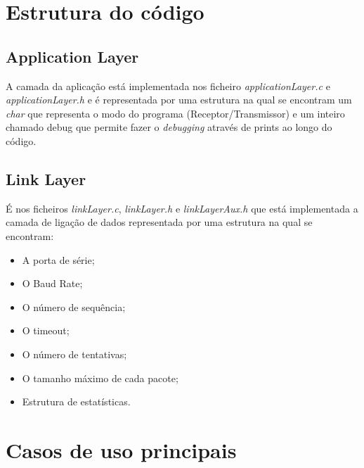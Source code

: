 \documentclass[11pt]{article}
\begin{document}
\section{Estrutura do código}

\subsection{Application Layer}
 
  A camada da aplicação está implementada nos ficheiro \textit{applicationLayer.c} e \textit{applicationLayer.h} e é representada por uma estrutura na qual se encontram um \textit{char} que representa o modo do programa (Receptor/Transmissor) e um inteiro chamado debug que permite fazer o \textit{debugging} através de prints ao longo do código.
 
\small

\normalsize

\subsection{Link Layer}
 
 É nos ficheiros \textit{linkLayer.c}, \textit{linkLayer.h} e \textit{linkLayerAux.h} que está implementada a camada de ligação de dados representada por uma estrutura na qual se encontram:

\begin{itemize}
\setlength\itemsep{0em}
  \item A porta de série;
   \item O Baud Rate;
   \item O número de sequência;
   \item O timeout;
   \item O número de tentativas;
   \item O tamanho máximo de cada pacote;
   \item Estrutura de estatísticas.
\end{itemize}

\small

\normalsize

\section{Casos de uso principais}
 
\end{document}
